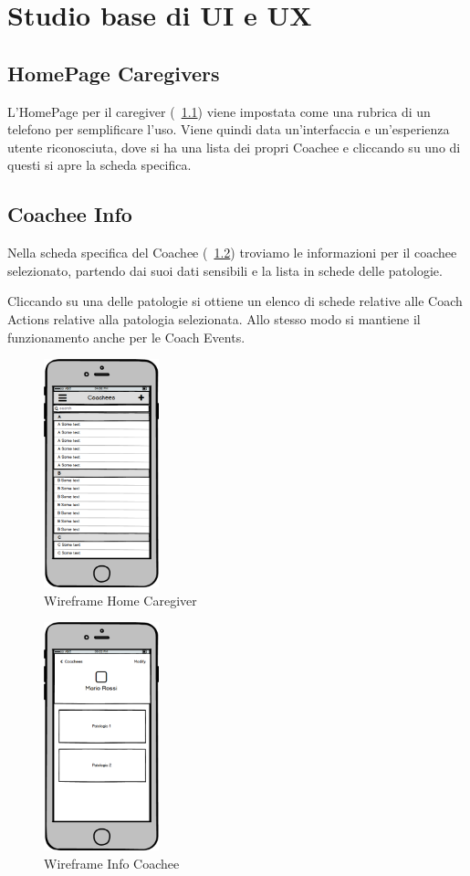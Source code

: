 \documentclass[a4paper,titlepage]{book}
\begin{document}
\chapter{Studio base di UI e UX}
\section{HomePage Caregivers}
L'HomePage per il caregiver (\figurename~\ref{fig:Coachees_List}) viene impostata come una rubrica di un telefono per semplificare l'uso. Viene quindi data un'interfaccia e un'esperienza utente riconosciuta, dove si ha una lista dei propri Coachee e cliccando su uno di questi si apre la scheda specifica.

\section{Coachee Info}
Nella scheda specifica del Coachee (\figurename~\ref{fig:Coachee_View}) troviamo le informazioni per il coachee selezionato, partendo dai suoi dati sensibili e la lista in schede delle patologie.

Cliccando su una delle patologie si ottiene un elenco di schede relative alle Coach Actions relative alla patologia selezionata. Allo stesso modo si mantiene il funzionamento anche per le Coach Events.

\begin{figure}
\center
\includegraphics[height=250px]{imgs/Coachees_List.png}
\caption{Wireframe Home Caregiver \label{fig:Coachees_List}}
\end{figure} 

\begin{figure}
\center
\includegraphics[height=250px]{imgs/Coachee_View.png}
\caption{Wireframe Info Coachee \label{fig:Coachee_View}}
\end{figure} 
\end{document}
